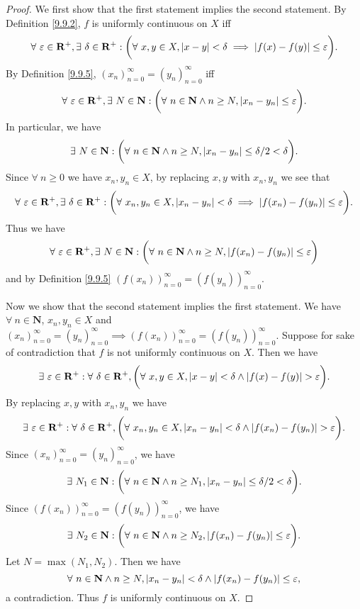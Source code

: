 \begin{proof}
    We first show that the first statement implies the second statement.
    By Definition \ref{9.9.2}, \(f\) is uniformly continuous on \(X\) iff
    \[
        \forall\ \varepsilon \in \mathbf{R}^+, \exists\ \delta \in \mathbf{R}^+ : \bigg(\forall\ x, y \in X, \abs*{x - y} < \delta \implies \abs*{f(x) - f(y)} \leq \varepsilon\bigg).
    \]
    By Definition \ref{9.9.5}, \((x_n)_{n = 0}^\infty = (y_n)_{n = 0}^\infty\) iff
    \[
        \forall\ \varepsilon \in \mathbf{R}^+, \exists\ N \in \mathbf{N} : \bigg(\forall\ n \in \mathbf{N} \land n \geq N, \abs*{x_n - y_n} \leq \varepsilon\bigg).
    \]
    In particular, we have
    \[
        \exists\ N \in \mathbf{N} : \bigg(\forall\ n \in \mathbf{N} \land n \geq N, \abs*{x_n - y_n} \leq \delta / 2 < \delta\bigg).
    \]
    Since \(\forall\ n \geq 0\) we have \(x_n, y_n \in X\), by replacing \(x, y\) with \(x_n, y_n\) we see that
    \[
        \forall\ \varepsilon \in \mathbf{R}^+, \exists\ \delta \in \mathbf{R}^+ : \bigg(\forall\ x_n, y_n \in X, \abs*{x_n - y_n} < \delta \implies \abs*{f(x_n) - f(y_n)} \leq \varepsilon\bigg).
    \]
    Thus we have
    \[
        \forall\ \varepsilon \in \mathbf{R}^+, \exists\ N \in \mathbf{N} : \bigg(\forall\ n \in \mathbf{N} \land n \geq N, \abs*{f(x_n) - f(y_n)} \leq \varepsilon\bigg)
    \]
    and by Definition \ref{9.9.5} \((f(x_n))_{n = 0}^\infty = (f(y_n))_{n = 0}^\infty\).

    Now we show that the second statement implies the first statement.
    We have \(\forall\ n \in \mathbf{N}\), \(x_n, y_n \in X\) and \((x_n)_{n = 0}^\infty = (y_n)_{n = 0}^\infty \implies (f(x_n))_{n = 0}^\infty = (f(y_n))_{n = 0}^\infty\).
    Suppose for sake of contradiction that \(f\) is not uniformly continuous on \(X\).
    Then we have
    \[
        \exists\ \varepsilon \in \mathbf{R}^+ : \forall\ \delta \in \mathbf{R}^+, \bigg(\forall\ x, y \in X, \abs*{x - y} < \delta \land \abs*{f(x) - f(y)} > \varepsilon\bigg).
    \]
    By replacing \(x, y\) with \(x_n, y_n\) we have
    \[
        \exists\ \varepsilon \in \mathbf{R}^+ : \forall\ \delta \in \mathbf{R}^+, \bigg(\forall\ x_n, y_n \in X, \abs*{x_n - y_n} < \delta \land \abs*{f(x_n) - f(y_n)} > \varepsilon\bigg).
    \]
    Since \((x_n)_{n = 0}^\infty = (y_n)_{n = 0}^\infty\), we have
    \[
        \exists\ N_1 \in \mathbf{N} : \bigg(\forall\ n \in \mathbf{N} \land n \geq N_1, \abs*{x_n - y_n} \leq \delta / 2 < \delta\bigg).
    \]
    Since \((f(x_n))_{n = 0}^\infty = (f(y_n))_{n = 0}^\infty\), we have
    \[
        \exists\ N_2 \in \mathbf{N} : \bigg(\forall\ n \in \mathbf{N} \land n \geq N_2, \abs*{f(x_n) - f(y_n)} \leq \varepsilon\bigg).
    \]
    Let \(N = \max(N_1, N_2)\).
    Then we have
    \[
        \forall\ n \in \mathbf{N} \land n \geq N, \abs*{x_n - y_n} < \delta \land \abs*{f(x_n) - f(y_n)} \leq \varepsilon,
    \]
    a contradiction.
    Thus \(f\) is uniformly continuous on \(X\).
\end{proof}


